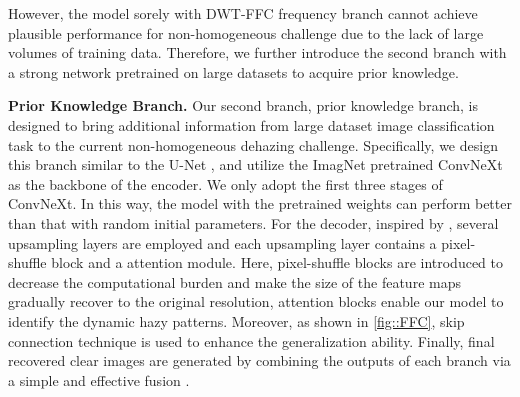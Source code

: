 \documentclass[10pt,twocolumn,letterpaper]{article}
\begin{document}
However, the model sorely with DWT-FFC frequency branch cannot achieve plausible performance for non-homogeneous challenge due to the lack of large volumes of training data. Therefore, we further introduce the second branch with a strong network pretrained on large datasets to acquire prior knowledge.

\textbf{Prior Knowledge Branch.} Our second branch, prior knowledge branch, is designed to bring additional information from large dataset image classification task to the current non-homogeneous dehazing challenge. Specifically, we design this branch similar to the U-Net \cite{U-Net}, and utilize the ImagNet pretrained ConvNeXt as the backbone of the encoder. We only adopt the first three stages of ConvNeXt. In this way, the model with the pretrained weights can perform better than that with random initial parameters. For the decoder, inspired by \cite{36}, several upsampling layers are employed and each upsampling layer contains a pixel-shuffle block and a attention module. Here, pixel-shuffle blocks are introduced to decrease the computational burden and make the size of the feature maps gradually recover to the original resolution, attention blocks enable our model to identify the dynamic hazy patterns. Moreover, as shown in \cref{fig::FFC}, skip connection technique is used to enhance the generalization ability. Finally, final recovered clear images are generated by combining the outputs of each branch via a simple and effective fusion \cite{two-branch}.
\end{document}
